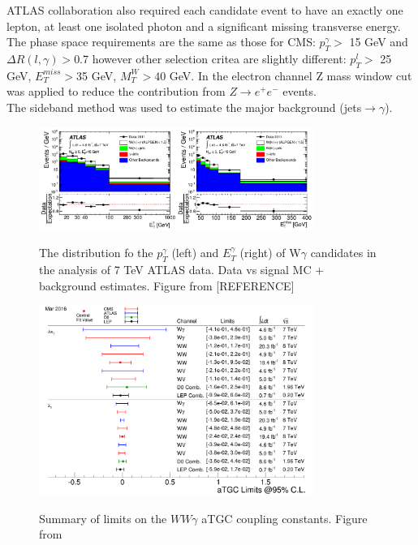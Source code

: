 

ATLAS collaboration also required each candidate event to have an exactly one lepton, at least one isolated photon and a significant missing transverse energy. The phase space requirements are the same as those for CMS: $p_T^{\gamma}>$ 15 GeV and $\Delta R(l,\gamma)>$0.7 however other selection critea are slightly different: $p_T^l>$ 25 GeV, $E_T^{miss}>$35 GeV, $M_T^W>40$ GeV. In the electron channel Z mass window cut was applied to reduce the contribution from $Z\rightarrow e^+e^-$ events.\\

The sideband method was used to estimate the major background (jets$\rightarrow\gamma$). 

\begin{figure}[htb]
  \begin{center}
    {\includegraphics[width=0.80\textwidth]{../figs/WgAbout/Wg7TeV_ATLAS_ptGamma.png}}
    \caption{The distribution fo the $p_T^\gamma$ (left) and $E_T^\gamma$ (right) of W$\gamma$ candidates in the analysis of 7 TeV ATLAS data. Data vs signal MC + background estimates. Figure from [REFERENCE]}
    \label{fig:Wg7TeV_ATLAS_ptGamma}
  \end{center}
\end{figure}

\begin{figure}[htb]
  \begin{center}
    {\includegraphics[width=0.80\textwidth]{../figs/WgAbout/aTGC_cg.png}}
    \caption{Summary of limits on the $WW\gamma$ aTGC coupling constants. Figure from \cite{ref_twiki_SMP_ATGC}}
    \label{fig:Wg7TeV_ATLAS_ptGamma}
  \end{center}
\end{figure}


